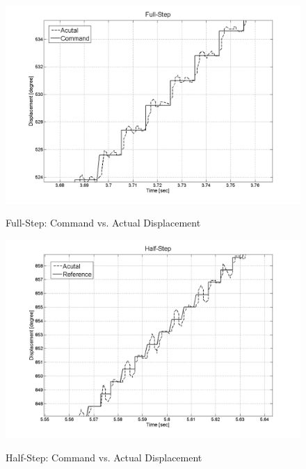 \documentclass{article}
\theoremstyle{plain}
\theoremstyle{definition}
\theoremstyle{remark}
\begin{document}
\begin{figure}[htb]
\begin{center}
\includegraphics[width=14cm]{Q4_full_step_L.png}
\caption{Full-Step: Command vs. Actual Displacement} \label{tex}
\label{fig:q4_15}
\end{center}
\end{figure}

\begin{figure}[htb]
\begin{center}
\includegraphics[width=14cm]{Q4_half_step_L.png}
\caption{Half-Step: Command vs. Actual Displacement} \label{tex}
\label{fig:q4_16}
\end{center}
\end{figure}
\end{document}
